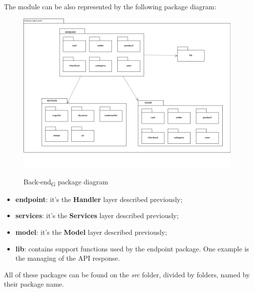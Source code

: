 The module can be also represented by the following package diagram:

\begin{figure}[H]
\centering
\includegraphics[scale=0.45]{res/Architettura/Backend/img/package-back-end}\\
\caption{Back-end\textsubscript{G} package diagram}
\end{figure}

\begin{itemize}
\item \textbf{endpoint}: it's the \textbf{Handler} layer described previously;
\item \textbf{services}: it's the \textbf{Services} layer described previously;
\item \textbf{model}: it's the \textbf{Model} layer described previously;
\item \textbf{lib}: contains support functions used by the endpoint package. One example is the managing of the API response.
\end{itemize}

All of these packages can be found on the \textit{src} folder, divided by folders, named by their package name.







